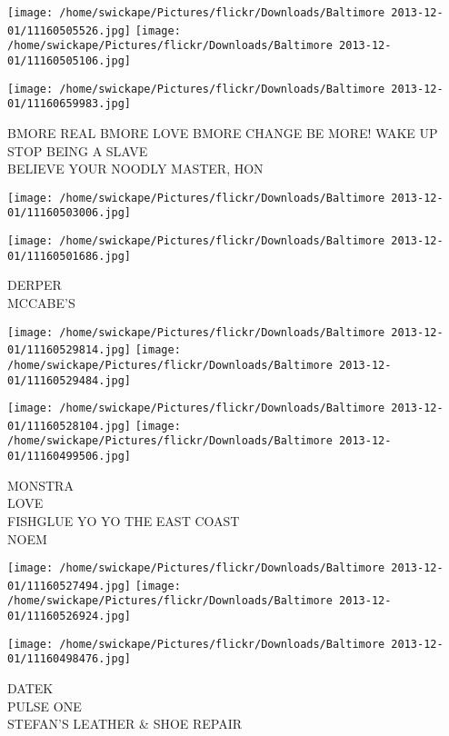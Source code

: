 \documentclass[10pt,letterpaper]{article}
\begin{document}
\texttt{[image: /home/swickape/Pictures/flickr/Downloads/Baltimore 2013-12-01/11160505526.jpg]}
\texttt{[image: /home/swickape/Pictures/flickr/Downloads/Baltimore 2013-12-01/11160505106.jpg]}

\vspace{0.25in}
\texttt{[image: /home/swickape/Pictures/flickr/Downloads/Baltimore 2013-12-01/11160659983.jpg]}

BMORE REAL BMORE LOVE BMORE CHANGE BE MORE! WAKE UP\\
STOP BEING A SLAVE\\
BELIEVE YOUR NOODLY MASTER, HON
\pagebreak

\texttt{[image: /home/swickape/Pictures/flickr/Downloads/Baltimore 2013-12-01/11160503006.jpg]}

\vspace{0.25in}
\texttt{[image: /home/swickape/Pictures/flickr/Downloads/Baltimore 2013-12-01/11160501686.jpg]}

DERPER\\
MCCABE'S
\pagebreak

\texttt{[image: /home/swickape/Pictures/flickr/Downloads/Baltimore 2013-12-01/11160529814.jpg]}
\texttt{[image: /home/swickape/Pictures/flickr/Downloads/Baltimore 2013-12-01/11160529484.jpg]}

\texttt{[image: /home/swickape/Pictures/flickr/Downloads/Baltimore 2013-12-01/11160528104.jpg]}
\texttt{[image: /home/swickape/Pictures/flickr/Downloads/Baltimore 2013-12-01/11160499506.jpg]}

MONSTRA\\
LOVE\\
FISHGLUE YO YO THE EAST COAST\\
NOEM
\pagebreak

\texttt{[image: /home/swickape/Pictures/flickr/Downloads/Baltimore 2013-12-01/11160527494.jpg]}
\texttt{[image: /home/swickape/Pictures/flickr/Downloads/Baltimore 2013-12-01/11160526924.jpg]}

\vspace{0.25in}
\texttt{[image: /home/swickape/Pictures/flickr/Downloads/Baltimore 2013-12-01/11160498476.jpg]}

DATEK\\
PULSE ONE\\
STEFAN'S LEATHER \& SHOE REPAIR
\pagebreak
\end{document}
